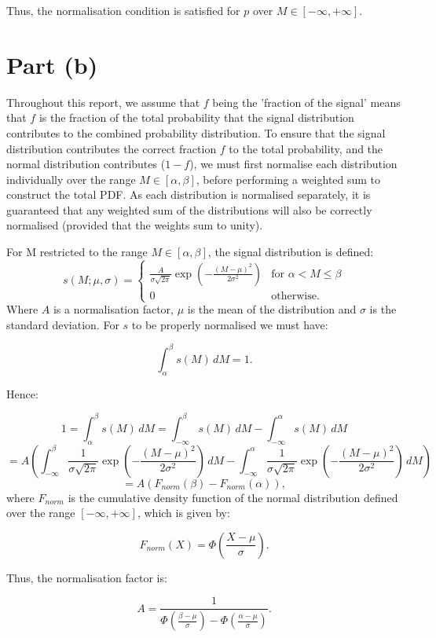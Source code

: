 \documentclass{article}
\begin{document}
Thus, the normalisation condition is satisfied for $p$ over $M \in [-\infty, +\infty]$.

\section*{Part (b)}

Throughout this report, we assume that $f$ being the 'fraction of the signal' means that $f$ is the fraction of the total probability that the signal distribution contributes to the combined probability distribution. To ensure that the signal distribution contributes the correct fraction $f$ to the total probability, and the normal distribution contributes ($1-f$), we must first normalise each distribution individually over the range $M \in [\alpha, \beta]$, before performing a weighted sum to construct the total PDF. As each distribution is normalised separately, it is guaranteed that any weighted sum of the distributions will also be correctly normalised (provided that the weights sum to unity). 

For M restricted to the range $M \in [\alpha, \beta]$, the signal distribution is defined:
\[
s(M; \mu, \sigma) =
\begin{cases} 
\frac{A}{\sigma\sqrt{2\pi}} \exp\left(-\frac{(M - \mu)^2}{2\sigma^2}\right) 
& \text{for } \alpha < M \leq \beta \\
0 & \text{otherwise}.
\end{cases} 
\]
Where $A$ is a normalisation factor, $\mu$ is the mean of the distribution and $\sigma$ is the standard deviation. For $s$ to be properly normalised we must have:

\[
\int_{\alpha}^{\beta} s(M) \, dM = 1.
\]

Hence:

\[
1 = \int_{\alpha}^{\beta} s(M) \, dM 
= 
\int_{-\infty}^{\beta} s(M) \, dM - \int_{-\infty}^{\alpha} s(M) \, dM
\]
\[
= A \left( 
\int_{-\infty}^{\beta} \frac{1}{\sigma\sqrt{2\pi}} \exp\left(-\frac{(M - \mu)^2}{2\sigma^2}\right) \, dM - 
\int_{-\infty}^{\alpha} \frac{1}{\sigma\sqrt{2\pi}} \exp\left(-\frac{(M - \mu)^2}{2\sigma^2}\right) \, dM
\right)
\]
\[
= A (F_{norm}(\beta) - F_{norm}(\alpha)),
\]
where $F_{norm}$ is the cumulative density function of the normal distribution defined over the range $[-\infty, +\infty]$, which is given by:

\[
F_{norm}(X) = \Phi(\frac{X-\mu}{\sigma}).
\]

Thus, the normalisation factor is:

\[
A = \frac{1}{\Phi(\frac{\beta-\mu}{\sigma}) - \Phi(\frac{\alpha-\mu}{\sigma})}.
\]
\end{document}
